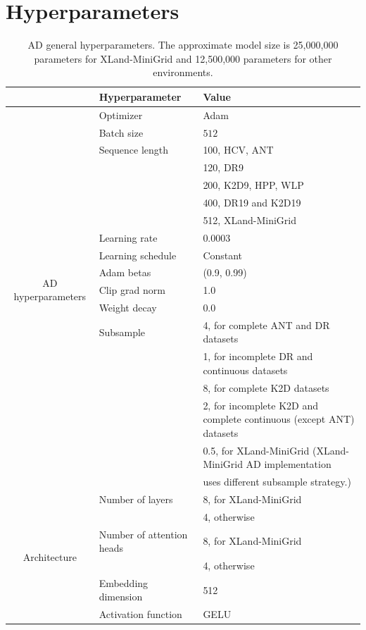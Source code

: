 \documentclass{article}
\begin{document}
\section{Hyperparameters}
\label{app:hyperparams}
\begin{table}[ht]
\centering
\caption{AD general hyperparameters. The approximate model size is 25,000,000 parameters for XLand-MiniGrid and 12,500,000 parameters for other environments.}
\begin{tabular}{cll}
\toprule
& Hyperparameter & Value \\
\midrule
\multirow{17}{*}{AD hyperparameters}
& Optimizer & Adam~\citep{kingma2014adam} \\
&Batch size   & $512$ \\
&Sequence length &  100, HCV, ANT \\
& &  120, DR9 \\
&& 200, K2D9, HPP, WLP\\
&& 400, DR19 and K2D19\\
&& 512, XLand-MiniGrid\\
&Learning rate & 0.0003 \\
&Learning schedule & Constant \\
&Adam betas & (0.9, 0.99) \\
&Clip grad norm & 1.0 \\
&Weight decay & 0.0 \\
&Subsample   & 4, for complete ANT and DR datasets\\
&& 1, for incomplete DR and continuous datasets\\
&& 8, for complete K2D datasets\\
&& 2, for incomplete K2D and complete continuous (except ANT) datasets\\
&& 0.5, for XLand-MiniGrid (XLand-MiniGrid AD implementation \\ && uses different subsample strategy.)\\
\midrule
\multirow{6}{*}{Architecture}         & Number of layers & 8, for XLand-MiniGrid\\
&& 4, otherwise  \\
&Number of attention heads    & 8, for XLand-MiniGrid\\
&& 4, otherwise  \\
&Embedding dimension    & 512  \\
&Activation function & GELU\\
\bottomrule
\end{tabular}
\vspace{6pt}
\label{table:ad_hyp}
\end{table}
\end{document}
